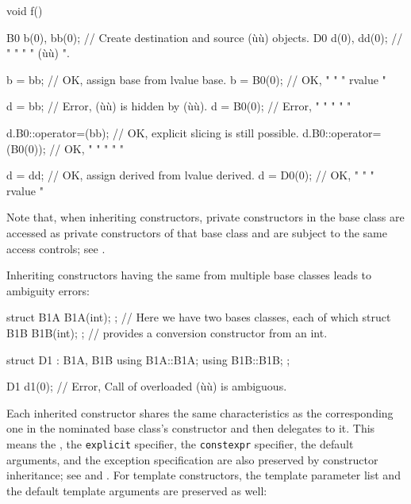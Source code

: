 \begin{emcppslisting}[emcppsbatch=e1]
void f()
{
    B0 b(0), bb(0);  // Create destination and source (ù{}ù) objects.
    D0 d(0), dd(0);  //   "         "       "    "    (ù{}ù)    ".

    b = bb;          // OK, assign base from lvalue base.
    b = B0(0);       // OK,   "       "   "  rvalue   "

    d = bb;          // Error, (ù{}ù) is hidden by (ù{}ù).
    d = B0(0);       // Error,       "         "    "     "        "

    d.B0::operator=(bb);     // OK, explicit slicing is still possible.
    d.B0::operator=(B0(0));  // OK,    "         "      "   "      "

    d = dd;          // OK, assign derived from lvalue derived.
    d = D0(0);       // OK,   "        "     "  rvalue    "
}
\end{emcppslisting}
    
\noindent Note that, when inheriting constructors, private constructors in the
base class are accessed as private constructors of that base class and
are subject to the same access controls; see . 

Inheriting constructors having the same  from multiple
base classes leads to ambiguity errors:

\begin{emcppslisting}
struct B1A { B1A(int); }; // Here we have two bases classes, each of which
struct B1B { B1B(int); }; // provides a conversion constructor from an int.

struct D1 : B1A, B1B
{
    using B1A::B1A;
    using B1B::B1B;
};

D1 d1(0);  // Error, Call of overloaded (ù{}ù) is ambiguous.
\end{emcppslisting}
    
\noindent Each inherited constructor shares the same characteristics as the
corresponding one in the nominated base class's constructor and then
delegates to it. This means the , the
\lstinline!explicit! specifier, the \lstinline!constexpr! specifier, the
default arguments, and the exception specification are also preserved by
constructor inheritance; see  and .  
For template
constructors, the template parameter list and the default template
arguments are preserved as well:

